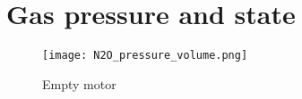 
\section{Gas pressure and state}

\begin{figure}[H]
  \centering
  \texttt{[image: N2O\_pressure\_volume.png]}
  \caption{Empty motor}
  \label{fig:N2O_P_V_graph}
\end{figure}